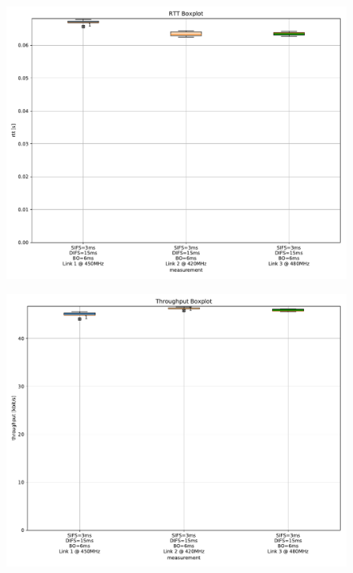 \documentclass{article}
\begin{document}
\begin{figure}
	\includegraphics[width=\textwidth]{rb_high_single/boxplot/rtt_boxplot}
\end{figure}

\begin{figure}
	\includegraphics[width=\textwidth]{rb_high_single/boxplot/throughput_boxplot}
\end{figure}


\end{document}

